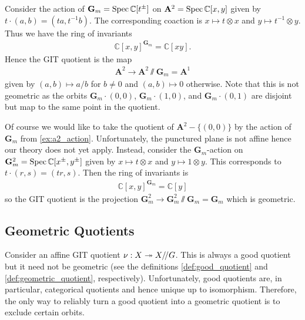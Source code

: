 \documentclass[12pt]{ociamthesis}  %
\begin{document}
\begin{example}\label{ex:nice_multiplicative_action}
  Consider the action of $\mathbf G_m=\operatorname{Spec}\mathbb C[t^\pm]$
  on $\mathbf A^2=\operatorname{Spec}\mathbb C[x,y]$ given by $t\cdot(a,b) = (ta,t^{-1}b)$.
  The corresponding coaction is $x \mapsto t\otimes x$ and $y\mapsto t^{-1}\otimes y$.
  Thus we have the ring of invariants
  \begin{align*}
    \mathbb C[x,y]^{\mathbf G_m} = \mathbb C[xy].
  \end{align*}
  Hence the GIT quotient is the map
  \begin{align*}
    \mathbf A^2 \longrightarrow \mathbf A^2 \sslash \mathbf G_m = \mathbf A^1
  \end{align*}
  given by $(a,b)\mapsto a/b$ for $b \neq 0$ and $(a,b)\mapsto 0$ otherwise.
  Note that this is not geometric as the orbits $\mathbf G_m\cdot(0,0)$,
  $\mathbf G_m\cdot (1,0)$, and $\mathbf G_m\cdot(0,1)$ are disjoint but
  map to the same point in the quotient.
\end{example}

\begin{example}
  Of course we would like to take the quotient of $\mathbf A^2-\{(0,0)\}$
  by the action of $\mathbf G_m$ from \ref{ex:a2_action}. Unfortunately, the punctured
  plane is not affine hence our theory does not yet apply. Instead,
  consider the $\mathbf G_m$-action on $\mathbf G_m^2 = \operatorname{Spec}\mathbb C[x^\pm,y^\pm]$
  given by $x \mapsto t\otimes x$ and $y\mapsto 1\otimes y$. This
  corresponds to $t\cdot(r,s) = (tr, s)$. Then the ring of invariants
  is
  \begin{align*}
    \mathbb C[x,y]^{\mathbf G_m} = \mathbb C[y]
  \end{align*}
  so the GIT quotient is the projection
  $\mathbf G^2_m \to \mathbf G^2_m \sslash \mathbf G_m = \mathbf G_m$
  which is geometric.
\end{example}

\subsection{Geometric Quotients}

Consider an affine GIT quotient $\nu : X \twoheadrightarrow X/\!/ G$. This is
always a good quotient but it need not be geometric
(see the definitions \ref{def:good_quotient} and \ref{def:geometric_quotient}, respectively).
Unfortunately, good quotients are, in particular, categorical
quotients \cite[Proposition 3.30]{hoskins2016} and hence unique
up to isomorphism. Therefore, the only way to reliably turn a good
quotient into a geometric quotient is to exclude certain orbits.
\end{document}
